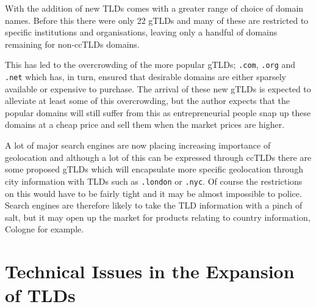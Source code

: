 \documentclass[11pt, a4paper]{article}
\begin{document}
With the addition of new \glspl{TLD} comes with a greater range of choice of
domain names. Before this there were only 22 \glspl{gTLD} and many of these are
restricted to specific institutions and organisations, leaving only a handful 
of domains remaining for non-\glspl{ccTLD} domains.

This has led to the overcrowding of the more popular \glspl{gTLD}; \texttt{.com},
\texttt{.org} and \texttt{.net} which has, in turn, ensured that desirable 
domains are either sparsely available or expensive to purchase. The arrival of
these new \glspl{gTLD} is expected to alleviate at least some of this 
overcrowding, but the author expects that the popular domains will still suffer
from this as entrepreneurial people snap up these domains at a cheap price and
sell them when the market prices are higher.

A lot of major search engines are now placing increasing importance of 
geolocation\cite{linkdex2012georanking} and although a lot of this can be
expressed through \glspl{ccTLD} there are some proposed \glspl{gTLD} which
will encapsulate more specific geolocation through city information with 
\glspl{TLD} such as \texttt{.london} or \texttt{.nyc}. Of course the 
restrictions on this would have to be fairly tight and it may be almost 
impossible to police. Search engines are therefore likely to take the
\gls{TLD} information with a pinch of salt, but it may open up the market for
products relating to country information, Cologne for example.






\section{Technical Issues in the Expansion of TLDs}



\newpage


\end{document}
